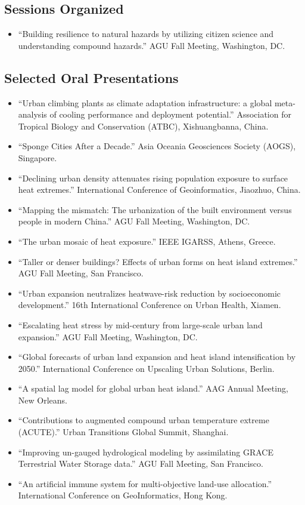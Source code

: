 \documentclass[11pt,letterpaper]{article}
\begin{document}
\subsection{Sessions Organized}
\begin{itemize}
  \item[2018] ``Building resilience to natural hazards by utilizing citizen science and understanding compound hazards.'' AGU Fall Meeting, Washington, DC.
\end{itemize}

\subsection{Selected Oral Presentations}
\begin{itemize}
  \item[2026] ``Urban climbing plants as climate adaptation infrastructure: a global meta-analysis of cooling performance and deployment potential.'' Association for Tropical Biology and Conservation (ATBC), Xishuangbanna, China.
  \item[2025] ``Sponge Cities After a Decade.'' Asia Oceania Geosciences Society (AOGS), Singapore.
  \item[2025] ``Declining urban density attenuates rising population exposure to surface heat extremes.'' International Conference of Geoinformatics, Jiaozhuo, China.
  \item[2024] ``Mapping the mismatch: The urbanization of the built environment versus people in modern China.'' AGU Fall Meeting, Washington, DC.
  \item[2024] ``The urban mosaic of heat exposure.'' IEEE IGARSS, Athens, Greece.
  \item[2023] ``Taller or denser buildings? Effects of urban forms on heat island extremes.'' AGU Fall Meeting, San Francisco.
  \item[2019] ``Urban expansion neutralizes heatwave-risk reduction by socioeconomic development.'' 16th International Conference on Urban Health, Xiamen.
  \item[2018] ``Escalating heat stress by mid-century from large-scale urban land expansion.'' AGU Fall Meeting, Washington, DC.
  \item[2018] ``Global forecasts of urban land expansion and heat island intensification by 2050.'' International Conference on Upscaling Urban Solutions, Berlin.
  \item[2018] ``A spatial lag model for global urban heat island.'' AAG Annual Meeting, New Orleans.
  \item[2016] ``Contributions to augmented compound urban temperature extreme (ACUTE).'' Urban Transitions Global Summit, Shanghai.
  \item[2013] ``Improving un-gauged hydrological modeling by assimilating GRACE Terrestrial Water Storage data.'' AGU Fall Meeting, San Francisco.
  \item[2012] ``An artificial immune system for multi-objective land-use allocation.'' International Conference on GeoInformatics, Hong Kong.
\end{itemize}
\end{document}
